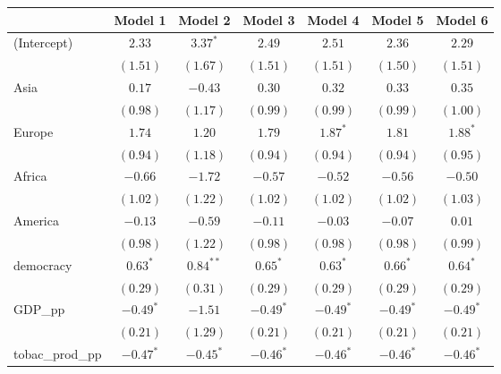 
\begin{table}[!h]
\begin{center}
\begin{tabular}{l c c c c c c }
\toprule
 & Model 1 & Model 2 & Model 3 & Model 4 & Model 5 & Model 6 \\
\midrule
(Intercept)             & $2.33$       & $3.37^{*}$   & $2.49$       & $2.51$       & $2.36$       & $2.29$       \\
                        & $(1.51)$     & $(1.67)$     & $(1.51)$     & $(1.51)$     & $(1.50)$     & $(1.51)$     \\
Asia                    & $0.17$       & $-0.43$      & $0.30$       & $0.32$       & $0.33$       & $0.35$       \\
                        & $(0.98)$     & $(1.17)$     & $(0.99)$     & $(0.99)$     & $(0.99)$     & $(1.00)$     \\
Europe                  & $1.74$       & $1.20$       & $1.79$       & $1.87^{*}$   & $1.81$       & $1.88^{*}$   \\
                        & $(0.94)$     & $(1.18)$     & $(0.94)$     & $(0.94)$     & $(0.94)$     & $(0.95)$     \\
Africa                  & $-0.66$      & $-1.72$      & $-0.57$      & $-0.52$      & $-0.56$      & $-0.50$      \\
                        & $(1.02)$     & $(1.22)$     & $(1.02)$     & $(1.02)$     & $(1.02)$     & $(1.03)$     \\
America                 & $-0.13$      & $-0.59$      & $-0.11$      & $-0.03$      & $-0.07$      & $0.01$       \\
                        & $(0.98)$     & $(1.22)$     & $(0.98)$     & $(0.98)$     & $(0.98)$     & $(0.99)$     \\
democracy               & $0.63^{*}$   & $0.84^{**}$  & $0.65^{*}$   & $0.63^{*}$   & $0.66^{*}$   & $0.64^{*}$   \\
                        & $(0.29)$     & $(0.31)$     & $(0.29)$     & $(0.29)$     & $(0.29)$     & $(0.29)$     \\
GDP\_pp                 & $-0.49^{*}$  & $-1.51$      & $-0.49^{*}$  & $-0.49^{*}$  & $-0.49^{*}$  & $-0.49^{*}$  \\
                        & $(0.21)$     & $(1.29)$     & $(0.21)$     & $(0.21)$     & $(0.21)$     & $(0.21)$     \\
tobac\_prod\_pp         & $-0.47^{*}$  & $-0.45^{*}$  & $-0.46^{*}$  & $-0.46^{*}$  & $-0.46^{*}$  & $-0.46^{*}$  \\

\end{tabular}
\end{center}
\end{table}
